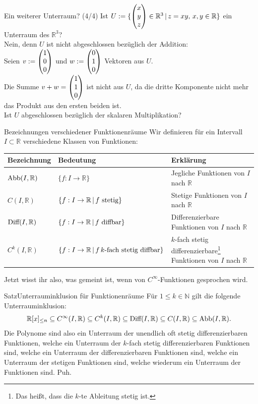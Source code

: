 \begin{Beispiel}
{Ein weiterer Unterraum? (4/4)}
Ist $U:=\{\begin{pmatrix}x\\y\\z\end{pmatrix}\in\mathbb{R}^3\,|\, z=x y, \,x,y\in\mathbb{R}\}$ ein Unterraum des $\mathbb{R}^3$?\\
Nein, denn $U$ ist nicht abgeschlossen bezüglich der Addition:\\
Seien $v:=\begin{pmatrix}1\\0\\0\end{pmatrix}$ und $w:=\begin{pmatrix}0\\1\\0\end{pmatrix}$ Vektoren aus $U$.\\
Die Summe $v+w=\begin{pmatrix}1\\1\\0\end{pmatrix}$ ist nicht aus $U$, da die dritte Komponente nicht mehr das Produkt aus den ersten beiden ist.\\
Ist $U$ abgeschlossen bezüglich der skalaren Multiplikation?
\end{Beispiel}
\begin{Def}
{Bezeichnungen verschiedener Funktionenräume}
Wir definieren für ein Intervall $I\subset \mathbb{R}$ verschiedene Klassen von Funktionen:\\
\begin{tabular}{l|l|l}
    \textbf{Bezeichnung} &\textbf{ Bedeutung }&\textbf{ Erklärung} \\
    \hline
    $\text{Abb}(I,\mathbb{R})$ & $\{f:I\to\mathbb{R}\}$ & \parbox[t]{5.4cm}{Jegliche Funktionen von $I$ nach $\mathbb{R}$}\\
    $C(I,\mathbb{R})$ & $\{f:I\to\mathbb{R}\,|\, f \text{ stetig}\}$ & \parbox[t]{5.4cm}{Stetige Funktionen von $I$ nach $\mathbb{R}$}\\
    $\text{Diff}(I,\mathbb{R})$ & $\{f:I\to\mathbb{R}\,|\, f \text{ diffbar}\}$ & \parbox[t]{5.4cm}{Differenzierbare Funktionen von $I$ nach $\mathbb{R}$}\\
    $C^k(I,\mathbb{R})$ & $\{f:I\to\mathbb{R}\,|\, f\, k \text{-fach stetig diffbar}\}$ & \parbox[t]{5.4cm}{$k$-fach stetig differenzierbare\footnote{Das heißt, dass die $k$-te Ableitung stetig ist.} Funktionen von $I$ nach $\mathbb{R}$}
\end{tabular}
Jetzt wisst ihr also, was gemeint ist, wenn von $C^\infty$-Funktionen gesprochen wird.
\end{Def}
\begin{Satz}
{Satz}{Unterrauminklusion für Funktionenräume}
Für $1\leq k\in\mathbb{N}$ gilt die folgende Unterrauminklusion:
\begin{equation*}
    \mathbb{R}[x]_{\leq n}\subseteq C^\infty(I,\mathbb{R})\subseteq C^k(I,\mathbb{R})\subseteq\text{Diff}(I,\mathbb{R})\subseteq C(I,\mathbb{R})\subseteq\text{Abb}(I,\mathbb{R}).
\end{equation*}
Die Polynome sind also ein Unterraum der unendlich oft stetig differenzierbaren Funktionen, welche ein Unterraum der $k$-fach stetig differenzierbaren Funktionen sind, welche ein Unterraum der differenzierbaren Funktionen sind, welche ein Unterraum der stetigen Funktionen sind, welche wiederum ein Unterraum der Funktionen sind. Puh.
\end{Satz}

